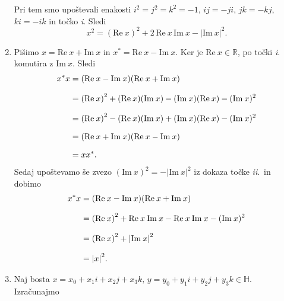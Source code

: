 \documentclass[mat1, tisk]{fmfdelo}
\numberwithin{equation}{section}
\begin{document}
\begin{dokaz}
\begin{enumerate}
\begin{equation*}
        \end{equation*}
        Pri tem smo upoštevali enakosti $i^2 = j^2 = k^2 = -1$, $ij = -ji$, $jk = -kj$, $ki = -ik$ in točko \textit{i}. Sledi
        \begin{equation*}
            x^2 = (\mathrm{Re} \: x)^2 + 2 \,\mathrm{Re} \: x \, \mathrm{Im} \: x -{|\mathrm{Im} \: x|}^2.
        \end{equation*}
        \item Pišimo $x = \mathrm{Re} \: x + \mathrm{Im} \: x$ in ${x}^* = \mathrm{Re} \: x - \mathrm{Im} \: x$. Ker je $\mathrm{Re} \: x \in \mathbb{R}$, po točki \textit{i}.\@ 
        komutira z $\mathrm{Im} \: x$. Sledi
        \begin{equation*}
        \setlength{\jot}{10pt}
            \begin{aligned}
                x^{*} x &=  (\mathrm{Re} \: x - \mathrm{Im} \: x)(\mathrm{Re} \: x + \mathrm{Im} \: x)\\
                &= {(\mathrm{Re} \: x)}^2 + (\mathrm{Re} \: x)(\mathrm{Im} \: x) - (\mathrm{Im} \: x)(\mathrm{Re} \: x) - (\mathrm{Im} \: x)^2\\
                &= {(\mathrm{Re} \: x)}^2 - (\mathrm{Re} \: x)(\mathrm{Im} \: x) + (\mathrm{Im} \: x)(\mathrm{Re} \: x) - (\mathrm{Im} \: x)^2\\
                &= (\mathrm{Re} \: x + \mathrm{Im} \: x)(\mathrm{Re} \: x - \mathrm{Im} \: x)\\
                &= x x^{*}.
            \end{aligned}
        \end{equation*}
        Sedaj upoštevamo še zvezo $(\mathrm{Im} \: x)^2 = -{|\mathrm{Im} \: x|}^2$ iz dokaza točke \textit{ii}.\ in dobimo
        \begin{equation*}
        \setlength{\jot}{10pt}
            \begin{aligned}
                x^{*} x &=  (\mathrm{Re} \: x - \mathrm{Im} \: x)(\mathrm{Re} \: x + \mathrm{Im} \: x)\\
                &= {(\mathrm{Re} \: x)}^2 + \mathrm{Re} \: x \: \mathrm{Im} \: x - \mathrm{Re} \: x \: \mathrm{Im} \: x - (\mathrm{Im} \: x)^2\\
                &= {(\mathrm{Re} \: x)}^2 + {|\mathrm{Im} \: x|}^2\\
                &= {|x|}^2.
            \end{aligned}
        \end{equation*}
        \item Naj bosta $x = x_{0} + x_{1}i + x_{2}j + x_{3}k, \, y = y_{0} + y_{1}i + y_{2}j + y_{3}k \in \mathbb{H}$. Izračunajmo

\end{enumerate}
\end{dokaz}
\end{document}
